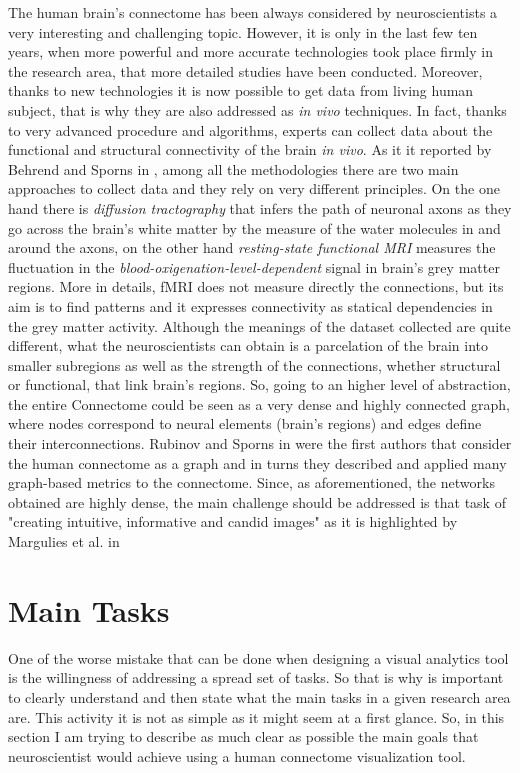 \documentclass{article}
\begin{document}
\begin{multicols}{2}
The human brain's connectome has been always considered by neuroscientists a very interesting and challenging topic. However, it is only in the last few ten years, when more powerful and more accurate technologies took place firmly in the research area, that more detailed studies have been conducted. Moreover, thanks to new technologies it is now possible to get data from living human subject, that is why they are also addressed as \textit{in vivo} techniques. In fact, thanks to very advanced procedure and algorithms, experts can collect data about the functional and structural connectivity of the brain \textit{in vivo}. As it it reported by Behrend and Sporns in \cite{humanConnectomics}, among all the methodologies there are two main approaches to collect data and they rely on very different principles. On the one hand there is \textit{diffusion tractography} that infers the path of neuronal axons as they go across the brain's white matter by the measure of the water molecules in and around the axons, on the other hand \textit{resting-state functional MRI} measures the fluctuation in the \textit{blood-oxigenation-level-dependent} signal in brain's grey matter regions. More in details, fMRI does not measure directly the connections, but its aim is to find patterns and it expresses connectivity as statical dependencies in the grey matter activity. Although the meanings of the dataset collected are quite different, what the neuroscientists can obtain is a parcelation of the brain into smaller subregions as well as the strength of the connections, whether structural or functional, that link brain's regions. So, going to an higher level of abstraction, the entire Connectome could be seen as a very dense and highly connected graph, where nodes correspond to neural elements (brain's regions) and edges define their interconnections. Rubinov and Sporns in \cite{complexNetworkMeasures} were the first authors that consider the human connectome as a graph and in turns they described and applied many graph-based metrics to the connectome. Since, as aforementioned, the networks obtained are highly dense, the main challenge should be addressed is that task of "creating intuitive, informative and candid images" as it is highlighted by Margulies et al. in \cite{visualizingHumanConnectome}

\section{Main Tasks}
\label{sec:mainTasks}
One of the worse mistake that can be done when designing a visual analytics tool is the willingness of addressing a spread set of tasks. So that is why is important to clearly understand and then state what the main tasks in a given research area are. This activity it is not as simple as it might seem at a first glance. So, in this section I am trying to describe as much clear as possible the main goals that neuroscientist would achieve using a human connectome visualization tool.\\


\end{multicols}
\end{document}
